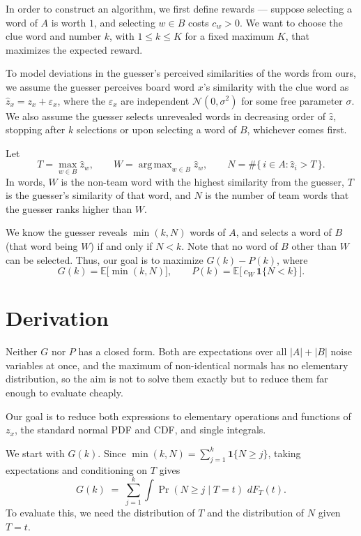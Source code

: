 \documentclass[12pt]{article}
\DeclareMathOperator*{\argmax}{arg\,max}
\begin{document}
In order to construct an algorithm, we first define rewards --- suppose
selecting a word of $A$ is worth $1$, and selecting $w \in B$ costs $c_w > 0$.
We want to choose the clue word and number $k$, with $1 \le k \le K$ for a
fixed maximum $K$, that maximizes the expected reward.

To model deviations in the guesser's perceived similarities of the words from
ours, we assume the guesser perceives board word $x$'s similarity with the clue
word as $\hat z_x = z_x + \varepsilon_x$, where the $\varepsilon_x$ are
independent $\mathcal N(0, \sigma^2)$ for some free parameter $\sigma$. We also
assume the guesser selects unrevealed words in decreasing order of $\hat z$,
stopping after $k$ selections or upon selecting a word of $B$, whichever comes
first.

Let
\[ T = \max_{w \in B} \hat z_w, \qquad W = \argmax_{w \in B} \hat z_w,
   \qquad N = \#\{\, i \in A : \hat z_i > T \,\}. \]
In words, $W$ is the non-team word with the highest similarity from the guesser, $T$ is the guesser's similarity of that word, and $N$ is the number of team words that the guesser ranks higher than $W$.

We know the guesser reveals
$\min(k, N)$ words of $A$, and selects a word of $B$ (that word being 
$W$) if and only if $N < k$. Note that no word of $B$ other than $W$ can be selected. Thus, our goal is to maximize $G(k) - P(k)$, where 
\[ G(k) = \mathbb E\bigl[\min(k, N)\bigr], \qquad
   P(k) = \mathbb E\bigl[\, c_{W}\,\mathbf 1\{N < k\} \,\bigr]. \]

\section{Derivation}
\label{sec:derivation}

Neither $G$ nor $P$ has a closed form. Both are expectations over all
$|A| + |B|$ noise variables at once, and the maximum of non-identical normals
has no elementary distribution, so the aim is not to solve them exactly but to
reduce them far enough to evaluate cheaply.

Our goal is to reduce both expressions to elementary operations and functions of $z_x$, the standard normal PDF and CDF, and single integrals.

We start with $G(k)$. Since $\min(k, N) = \sum_{j=1}^{k} \mathbf 1\{N \ge j\}$,
taking expectations and conditioning on $T$ gives
\[ G(k) \;=\; \sum_{j=1}^{k} \int \Pr(N \ge j \mid T = t) \,\, dF_T(t). \]
To evaluate this, we need the distribution of $T$ and the
distribution of $N$ given $T = t$.
\end{document}
